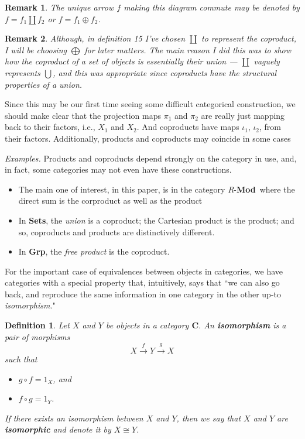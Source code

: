 \documentclass[12pt,reqno]{amsart}
\theoremstyle{plain}
\newtheorem{defi}{Definition}
\newtheorem{rem}{Remark}
\newcommand{\cat}{\mathbf{C}}
\newcommand{\rmod}{\textit{R}-\textbf{Mod}}
\begin{document}
\begin{rem} The unique arrow $f$ making this diagram commute may be denoted by $f = f_1 \coprod f_2$ or $f = f_1 \oplus f_2$. 
\end{rem} 
\begin{rem} Although, in definition 15 I've chosen $\coprod$ to represent the coproduct, I will be choosing $\bigoplus$ for later matters. The main reason I did this was to show how the coproduct of a set of objects is essentially their union — $\coprod$ vaguely represents $\bigcup$, and this was appropriate since coproducts have the structural properties of a union.
\end{rem} 

Since this may be our first time seeing some difficult categorical construction, we should make clear that the projection maps $\pi_1$ and $\pi_2$ are really just mapping back to their factors, i.e., $X_1$ and $X_2$. And coproducts have maps $\iota_1$, $\iota_2$, from their factors. Additionally, products and coproducts may coincide in some cases

\textit{Examples.} Products and coproducts depend strongly on the category in use, and, in fact, some categories may not even have these constructions. 
\begin{itemize}
\item The main one of interest, in this paper, is in the category \rmod \, where the direct sum is the corproduct as well as the product
\item In \textbf{Sets}, the \textit{union} is a coproduct; the Cartesian product is the product; and so, coproducts and products are distinctively different. 
\item In \textbf{Grp}, the \textit{free product} is the coproduct. 
\end{itemize}

For the important case of equivalences between objects in categories, we have categories with a special property that, intuitively, says that ``we can also go back, and reproduce the same information in one category in the other up-to \textit{isomorphism}."

\begin{defi} Let $X$ and $Y$ be objects in a category $\cat$. An \textbf{isomorphism} is a pair of morphisms $$X \xrightarrow{f} Y \xrightarrow{g} X$$
such that

\begin{itemize}
\item[$(a)$] $g \circ f = 1_X$, and
\item[$(b)$] $f \circ g = 1_Y$.
\end{itemize}

If there exists an isomorphism between $X$ and $Y$, then we say that $X$ and $Y$ are \textbf{isomorphic} and denote it by $X \cong Y$. 
\end{defi} 
\end{document}
